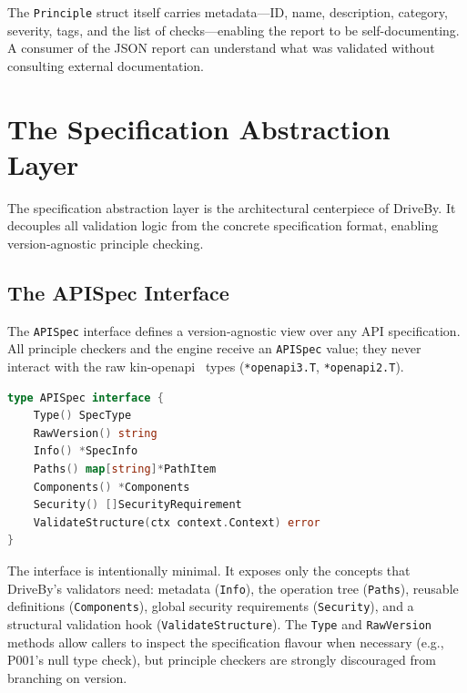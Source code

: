 The \texttt{Principle} struct itself carries metadata---ID, name, description, category, severity, tags, and the list of checks---enabling the report to be self-documenting. A consumer of the JSON report can understand what was validated without consulting external documentation.

\section{The Specification Abstraction Layer}
\label{sec:spec-abstraction}

The specification abstraction layer is the architectural centerpiece of DriveBy. It decouples all validation logic from the concrete specification format, enabling version-agnostic principle checking.

\subsection{The APISpec Interface}
\label{subsec:apispec-interface}

The \texttt{APISpec} interface defines a version-agnostic view over any API specification. All principle checkers and the engine receive an \texttt{APISpec} value; they never interact with the raw kin-openapi~\cite{kin-openapi} types (\texttt{*openapi3.T}, \texttt{*openapi2.T}).

\begin{lstlisting}[language=Go,caption={The APISpec interface (\texttt{spec/spec.go}).},label={lst:apispec}]
type APISpec interface {
    Type() SpecType
    RawVersion() string
    Info() *SpecInfo
    Paths() map[string]*PathItem
    Components() *Components
    Security() []SecurityRequirement
    ValidateStructure(ctx context.Context) error
}
\end{lstlisting}

The interface is intentionally minimal. It exposes only the concepts that DriveBy's validators need: metadata (\texttt{Info}), the operation tree (\texttt{Paths}), reusable definitions (\texttt{Components}), global security requirements (\texttt{Security}), and a structural validation hook (\texttt{ValidateStructure}). The \texttt{Type} and \texttt{RawVersion} methods allow callers to inspect the specification flavour when necessary (e.g., P001's null type check), but principle checkers are strongly discouraged from branching on version.

